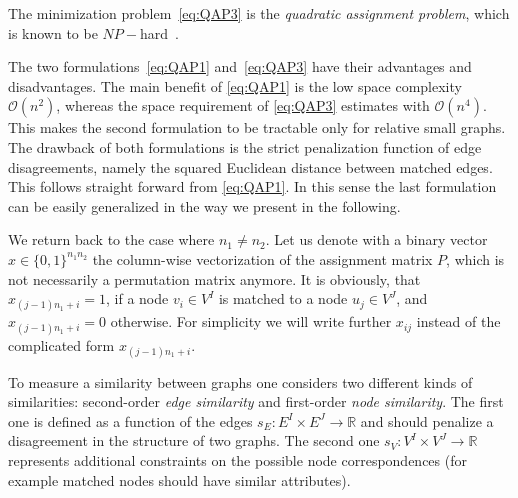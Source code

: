 The minimization problem~\eqref{eq:QAP3} is the \emph{quadratic assignment problem}, which is known to be $NP-$hard~\cite{Burkard98thequadratic,Sahni1974}.

The two formulations~\eqref{eq:QAP1} and~\eqref{eq:QAP3} have their advantages and disadvantages. The main benefit of \eqref{eq:QAP1} is the low space complexity $\mathcal O(n^2)$, whereas the space requirement of \eqref{eq:QAP3} estimates with $\mathcal O(n^4)$. This makes the second formulation to be tractable only for relative small graphs. The drawback of both formulations is the strict penalization function of edge disagreements, namely the squared Euclidean distance between matched edges. This follows straight forward from \eqref{eq:QAP1}. In this sense the last formulation can be easily generalized in the way we present in the following.

We return back to the case where $n_1\not=n_2$. Let us denote with a binary vector $x\in \{0,1\}^{n_1n_2}$ the column-wise vectorization of the assignment matrix $P$, which is not necessarily a permutation matrix anymore. It is obviously, that $x_{(j-1)n_1+i}=1$, if a node $v_i\in V^I$ is matched to a node $u_j\in V^J$, and $x_{(j-1)n_1+i}=0$ otherwise. For simplicity we will write further $x_{ij}$ instead of the complicated form $x_{(j-1)n_1+i}$.
 

To measure a similarity between graphs one considers two different kinds of similarities: second-order \emph{edge similarity} and first-order \emph{node similarity}. The first one is defined as a function of the edges $s_E:E^I\times E^J\rightarrow\mathbb{R}$ and should penalize a disagreement in the structure of two graphs. The second one $s_V:V^I\times V^J\rightarrow\mathbb{R}$ represents additional constraints on the possible node correspondences (for example matched nodes should have similar attributes).


